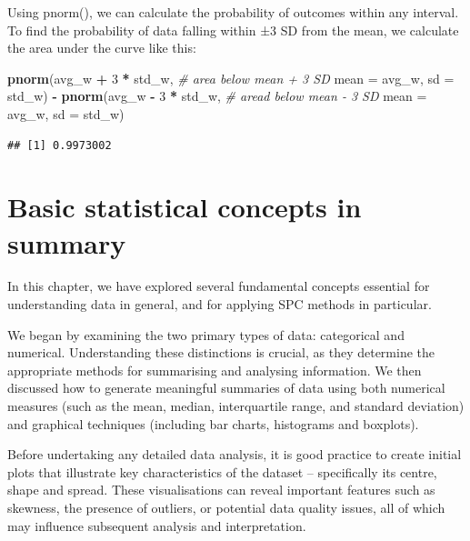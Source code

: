 \documentclass[
]{book}
\newenvironment{Shaded}{\begin{snugshade}}{\end{snugshade}}
\newcommand{\AttributeTok}[1]{\textcolor[rgb]{0.13,0.29,0.53}{#1}}
\newcommand{\CommentTok}[1]{\textcolor[rgb]{0.56,0.35,0.01}{\textit{#1}}}
\newcommand{\DecValTok}[1]{\textcolor[rgb]{0.00,0.00,0.81}{#1}}
\newcommand{\FunctionTok}[1]{\textcolor[rgb]{0.13,0.29,0.53}{\textbf{#1}}}
\newcommand{\NormalTok}[1]{#1}
\newcommand{\SpecialCharTok}[1]{\textcolor[rgb]{0.81,0.36,0.00}{\textbf{#1}}}
\begin{document}
Using pnorm(), we can calculate the probability of outcomes within any interval. To find the probability of data falling within ±3 SD from the mean, we calculate the area under the curve like this:

\begin{Shaded}
\begin{Highlighting}[]
\FunctionTok{pnorm}\NormalTok{(avg\_w }\SpecialCharTok{+} \DecValTok{3} \SpecialCharTok{*}\NormalTok{ std\_w,    }\CommentTok{\# area below mean + 3 SD}
      \AttributeTok{mean =}\NormalTok{ avg\_w,}
      \AttributeTok{sd   =}\NormalTok{ std\_w) }\SpecialCharTok{{-}} 
  \FunctionTok{pnorm}\NormalTok{(avg\_w }\SpecialCharTok{{-}} \DecValTok{3} \SpecialCharTok{*}\NormalTok{ std\_w,  }\CommentTok{\# aread below mean {-} 3 SD}
        \AttributeTok{mean =}\NormalTok{ avg\_w, }
        \AttributeTok{sd   =}\NormalTok{ std\_w)}
\end{Highlighting}
\end{Shaded}

\begin{verbatim}
## [1] 0.9973002
\end{verbatim}

\section{Basic statistical concepts in summary}\label{basic-statistical-concepts-in-summary}

In this chapter, we have explored several fundamental concepts essential for understanding data in general, and for applying SPC methods in particular.

We began by examining the two primary types of data: categorical and numerical. Understanding these distinctions is crucial, as they determine the appropriate methods for summarising and analysing information. We then discussed how to generate meaningful summaries of data using both numerical measures (such as the mean, median, interquartile range, and standard deviation) and graphical techniques (including bar charts, histograms and boxplots).

Before undertaking any detailed data analysis, it is good practice to create initial plots that illustrate key characteristics of the dataset -- specifically its centre, shape and spread. These visualisations can reveal important features such as skewness, the presence of outliers, or potential data quality issues, all of which may influence subsequent analysis and interpretation.
\end{document}
